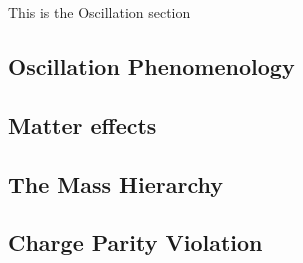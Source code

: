 This is the Oscillation section
\subsection{Oscillation Phenomenology}
\subsection{Matter effects}
\subsection{The Mass Hierarchy}
\subsection{Charge Parity Violation}